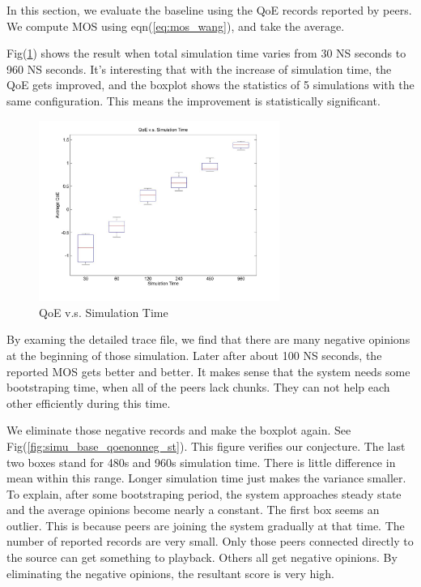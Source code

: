 \documentclass[11pt,a4paper]{article}
\begin{document}
In this section, we evaluate the baseline using the QoE records 
reported by peers. We compute MOS using eqn(\ref{eq:mos_wang}),
and take the average. 

Fig(\ref{fig:simu_base_qoe_st}) shows the result when total simulation 
time varies from 30 NS seconds to 960 NS seconds. It's interesting that
with the increase of simulation time, the QoE gets improved, and the 
boxplot shows the statistics of 5 simulations with the same 
configuration. This means the improvement is statistically significant. 

\begin{figure}[htb]
\centering
	\includegraphics[width=0.7\textwidth]{../fig/simutime_qoe.jpg}
	\caption{QoE v.s. Simulation Time}
	\label{fig:simu_base_qoe_st}
\end{figure}

By examing the detailed trace file, we find that there are many 
negative opinions at the beginning of those simulation. Later after
about 100 NS seconds, the reported MOS gets better and better. It
makes sense that the system needs some bootstraping time, when 
all of the peers lack chunks. They can not help each other efficiently
during this time. 

We eliminate those negative records and make the boxplot again. See 
Fig(\ref{fig:simu_base_qoenonneg_st}). This figure verifies our 
conjecture. The last two boxes stand for 480s and 960s simulation time. 
There is little difference in mean within this range. Longer simulation time
just makes the variance smaller. To explain, after some bootstraping period, 
the system approaches steady state and the average opinions become 
nearly a constant. The first box seems an outlier. This is because peers are
joining the system gradually at that time. The number of reported records
are very small. Only those peers connected directly to the source can 
get something to playback. Others all get negative opinions. By eliminating 
the negative opinions, the resultant score is very high. 
\end{document}

